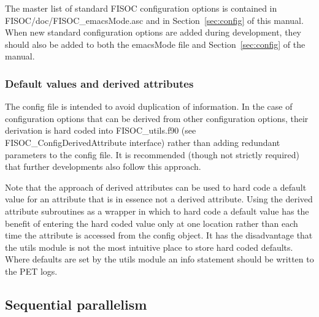 \documentclass[11pt]{article}
\begin{document}
The master list of standard FISOC configuration options is contained in 
FISOC/doc/FISOC\_emacsMode.asc and in Section~\ref{sec:config} of this 
manual. 
When new standard configuration options are added during development, they 
should also be added to both the emacsMode file and  
Section~\ref{sec:config} of the manual.


\subsubsection{Default values and derived attributes}

The config file is intended to avoid duplication of information.  
In the case of configuration options that can be derived from other 
configuration options, their derivation is hard coded into 
FISOC\_utils.f90 (see FISOC\_ConfigDerivedAttribute interface) 
rather than adding redundant parameters to the config file.
It is recommended (though not strictly required) that further developments 
also follow this approach. 

Note that the approach of derived attributes can be used to hard code a 
default value for an attribute that is in essence not a derived attribute. 
Using the derived attribute subroutines as a wrapper in which to hard 
code a default value has the benefit of entering the hard coded value 
only at one location rather than each time the attribute is accessed 
from the config object.
It has the disadvantage that the utils module is not the most intuitive
place to store hard coded defaults.
Where defaults are set by the utils module an info statement should be written
to the PET logs. 






\subsection{Sequential parallelism}
\end{document}

